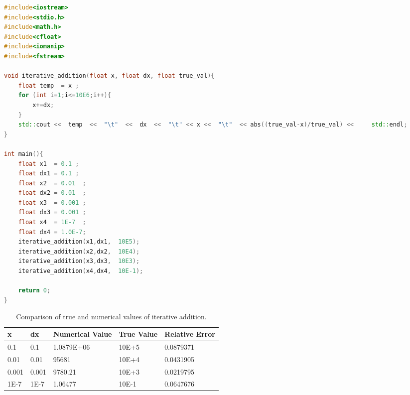 \documentclass[a4,12pt]{article}
\numberwithin{equation}{subsection}
\begin{document}
 \begin{lstlisting}[language=C++, caption= C++ code to implement iterative addition algorithm., label= list3]
#include<iostream>
#include<stdio.h>
#include<math.h>
#include<cfloat>
#include<iomanip>
#include<fstream>

void iterative_addition(float x, float dx, float true_val){
    float temp  = x ;
    for (int i=1;i<=10E6;i++){
        x+=dx;
    }
    std::cout <<  temp  <<  "\t"  <<  dx  <<  "\t" << x <<  "\t"  << abs((true_val-x)/true_val) <<     std::endl;
}

int main(){
    float x1  = 0.1 ;
    float dx1 = 0.1 ;
    float x2  = 0.01  ;
    float dx2 = 0.01  ;
    float x3  = 0.001 ;
    float dx3 = 0.001 ;
    float x4  = 1E-7  ;
    float dx4 = 1.0E-7;  
    iterative_addition(x1,dx1,  10E5);
    iterative_addition(x2,dx2,  10E4);
    iterative_addition(x3,dx3,  10E3);
    iterative_addition(x4,dx4,  10E-1);

    return 0;
}
\end{lstlisting} 

\begin{table}[h]
\centering
\begin{tabular}{|l|l|l|l|l|}
\hline
\textbf{x} & \textbf{dx} & \textbf{Numerical Value} & \textbf{True Value} & \textbf{Relative Error} \\
\hline
0.1        & 0.1         & 1.0879E+06               & 10E+5               & 0.0879371               \\
0.01       & 0.01        & 95681                    & 10E+4               & 0.0431905               \\
0.001      & 0.001       & 9780.21                  & 10E+3               & 0.0219795               \\
1E-7       & 1E-7        & 1.06477                  & 10E-1               & 0.0647676 \\
\hline             
\end{tabular}
\caption{Comparison of true and numerical values of iterative addition.}
\label{tab:my-table}
\end{table}
\end{document}
